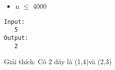\begin{itemize}
	\item n $\le$ 4000
\end{itemize}
\begin{verbatim}
Input:
   5
Output:
   2
\end{verbatim}

Giải thích: Có 2 dãy là (1,4)và (2,3)